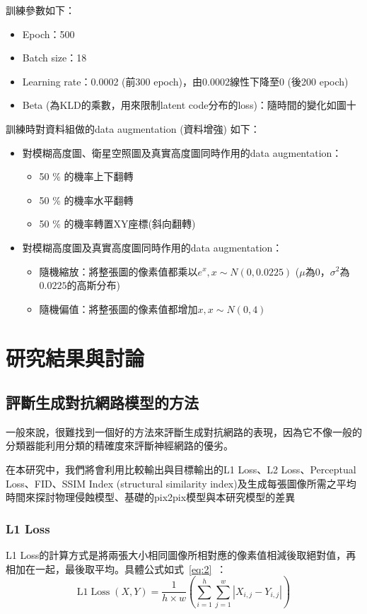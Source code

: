\documentclass[a4paper, 12pt]{article}
\begin{document}
\noindent 訓練參數如下：
\begin{itemize}
\item Epoch：500
\item Batch size：18
\item Learning rate：0.0002 (前300 epoch)，由0.0002線性下降至0 (後200 epoch)
\item Beta (為KLD的乘數，用來限制latent code分布的loss)：隨時間的變化如圖十
\end{itemize}
	
\noindent 訓練時對資料組做的data augmentation (資料增強) 如下：
\begin{itemize}
\item 對模糊高度圖、衛星空照圖及真實高度圖同時作用的data augmentation：
	\begin{itemize}
		\item 50 \% 的機率上下翻轉
		\item 50 \% 的機率水平翻轉
		\item 50 \% 的機率轉置XY座標(斜向翻轉)
	\end{itemize}
	\item 對模糊高度圖及真實高度圖同時作用的data augmentation：
	\begin{itemize}
		\item 隨機縮放：將整張圖的像素值都乘以$e^x, x \sim N(0,0.0225)$ ($\mu$為0，$\sigma^2$為$0.0225$的高斯分布)
		\item 隨機偏值：將整張圖的像素值都增加$x, x\sim N(0,4)$
	\end{itemize}
\end{itemize}



\section{研究結果與討論}
\label{sec:res}
\subsection{評斷生成對抗網路模型的方法}
一般來說，很難找到一個好的方法來評斷生成對抗網路的表現，因為它不像一般的分類器能利用分類的精確度來評斷神經網路的優劣。

在本研究中，我們將會利用比較輸出與目標輸出的L1 Loss、L2 Loss、Perceptual Loss、FID、SSIM Index (structural similarity index)及生成每張圖像所需之平均時間來探討物理侵蝕模型、基礎的pix2pix模型與本研究模型的差異

\subsubsection{L1 Loss}
L1 Loss的計算方式是將兩張大小相同圖像所相對應的像素值相減後取絕對值，再相加在一起，最後取平均。具體公式如式~\ref{eq:2}~：
\begin{equation}
    \mathrm{L} 1 \operatorname{Loss}(X, Y)=\frac{1}{h \times w}\left(\sum_{i=1}^{h} \sum_{j=1}^{w}\left|X_{i, j}-Y_{i, j}\right|\right)
    \label{eq:2}
\end{equation}
\end{document}
